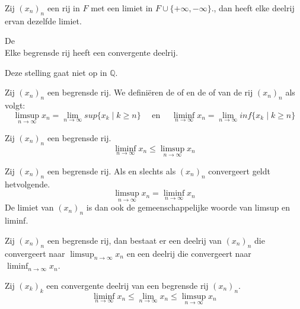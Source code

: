 \documentclass[main.tex]{subfiles}
\begin{document}
\begin{pr}
  Zij $(x_{n})_{n}$ een rij in $F$ met een limiet in $F\cup\{+\infty,-\infty\}$., dan heeft elke deelrij ervan dezelfde limiet.
\end{pr}

\begin{st}
  De \\
  Elke begrensde rij heeft een convergente deelrij.
\end{st}
\begin{opm}
  Deze stelling gaat niet op in $\mathbb{Q}$.
\end{opm}

\begin{de}
  Zij $(x_{n})_{n}$ een begrensde rij.
  We defini\"eren de  of  en de  of  van de rij $(x_{n})_{n}$ als volgt:
  \[ \limsup_{n\rightarrow \infty} x_{n} = \lim_{n\rightarrow \infty} sup\{x_{k}\mid k\ge n\} \quad\text{ en }\quad \liminf_{n\rightarrow \infty} x_{n} = \lim_{n\rightarrow \infty} inf\{ x_{k}\mid k\ge n\} \]
\end{de}

\begin{pr}
  Zij $(x_{n})_{n}$ een begrensde rij.
  \[ \liminf_{n\rightarrow \infty} x_{n} \le \limsup_{n\rightarrow \infty} x_{n} \]
\end{pr}

\begin{pr}
  Zij $(x_{n})_{n}$ een begrensde rij.
  Als en slechts als $(x_{n})_{n}$ convergeert geldt hetvolgende.
  \[ \limsup_{n\rightarrow \infty} x_{n} = \liminf_{n\rightarrow \infty} x_{n} \]
  De limiet van $(x_{n})_{n}$ is dan ook de gemeenschappelijke woorde van limsup en liminf.
\end{pr}

\begin{pr}
  Zij $(x_{n})_{n}$ een begrensde rij, dan bestaat er een deelrij van $(x_{n})_{n}$ die convergeert naar $\limsup_{n\rightarrow \infty} x_{n}$ en een deelrij die convergeert naar $\liminf_{n\rightarrow \infty} x_{n}$.

\end{pr}

\begin{pr}
  Zij $(x_{k})_{k}$ een convergente deelrij van een begrensde rij $(x_{n})_{n}$.
  \[ \liminf_{n\rightarrow \infty} x_{n} \le \lim_{n\rightarrow \infty} x_{n} \le \limsup_{n\rightarrow \infty} x_{n} \]

\end{pr}
\end{document}

